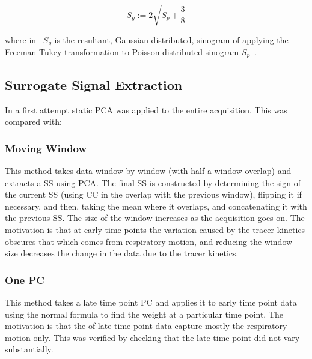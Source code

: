                 \begin{equation} \label{eq:pca_data_driven_surrogate_signal_extraction_methods_for_dynamic_pet_methods_freeman_tukey}
                    S_g := 2 \sqrt{S_p + \frac{3}{8}}
                \end{equation}

                \noindent where in~ $S_g$ is the resultant, Gaussian distributed, sinogram of applying the Freeman-Tukey transformation to Poisson distributed sinogram $S_p$~.
            
            \subsection{Surrogate Signal Extraction} \label{sec:pca_data_driven_surrogate_signal_extraction_methods_for_dynamic_pet_methods_surrogate_signal_extraction}
                In a first attempt static \gls{PCA} was applied to the entire acquisition. This was compared with:
                
                \subsubsection{Moving Window} \label{sec:pca_data_driven_surrogate_signal_extraction_methods_for_dynamic_pet_methods_moving_window}
                    This method takes data window by window (with half a window overlap) and extracts a \gls{SS} using \gls{PCA}. The final \gls{SS} is constructed by determining the sign of the current \gls{SS} (using \gls{CC} in the overlap with the previous window), flipping it if necessary, and then, taking the mean where it overlaps, and concatenating it with the previous \gls{SS}. The size of the window increases as the acquisition goes on. The motivation is that at early time points the variation caused by the tracer kinetics obscures that which comes from respiratory motion, and reducing the window size decreases the change in the data due to the tracer kinetics.
                
                \subsubsection{One PC} \label{sec:pca_data_driven_surrogate_signal_extraction_methods_for_dynamic_pet_methods_one_pc}
                    This method takes a late time point \gls{PC} and applies it to early time point data using the normal formula to find the weight at a particular time point. The motivation is that the  of late time point data capture mostly the respiratory motion only. This was verified by checking that the late time point  did not vary substantially.
            

